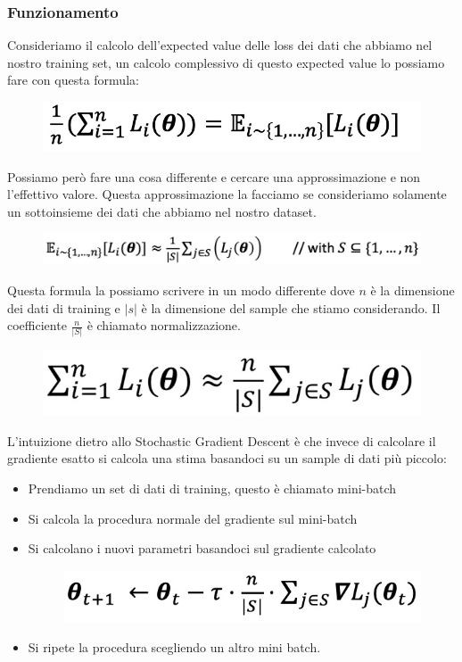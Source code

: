 \documentclass[14pt]{extreport}
\begin{document}
\subsubsection{Funzionamento}

Consideriamo il calcolo dell'expected value delle loss dei dati che abbiamo nel nostro training set, un calcolo complessivo di questo expected value
lo possiamo fare con questa formula:

\begin{figure}[H]
\centering
\includegraphics[width=0.7\linewidth]{260.jpeg}
\end{figure}

Possiamo però fare una cosa differente e cercare una approssimazione e non l'effettivo valore. Questa approssimazione la facciamo se consideriamo
solamente un sottoinsieme dei dati che abbiamo nel nostro dataset.

\begin{figure}[H]
\centering
\includegraphics[width=0.7\linewidth]{261.jpeg}
\end{figure}

Questa formula la possiamo scrivere in un modo differente dove $n$ è la dimensione dei dati di training e $|s|$ è la dimensione del sample che stiamo
considerando. Il coefficiente $\frac{n}{|S|}$ è chiamato normalizzazione.

\begin{figure}[H]
\centering
\includegraphics[width=0.7\linewidth]{262.jpeg}
\end{figure}

L'intuizione dietro allo Stochastic Gradient Descent è che invece di calcolare il gradiente esatto si calcola una stima basandoci su un sample di dati
più piccolo:
\begin{itemize}
\item Prendiamo un set di dati di training, questo è chiamato mini-batch
\item Si calcola la procedura normale del gradiente sul mini-batch
\item Si calcolano i nuovi parametri basandoci sul gradiente calcolato
\begin{figure}[H]
\centering
\includegraphics[width=0.7\linewidth]{263.jpeg}
\end{figure}
\item Si ripete la procedura scegliendo un altro mini batch.
\end{itemize}
 
\end{document}
